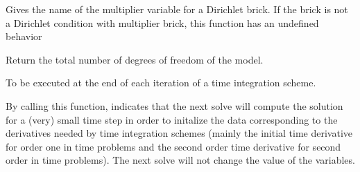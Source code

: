 \documentclass[a4paper,11pt,english]{sphinxmanual}
\begin{document}
\begin{fulllineitems}
\begin{fulllineitems}
\label{\detokenize{python/cmdref_Model:getfem.Model.mult_varname_Dirichlet}}
Gives the name of the multiplier variable for a Dirichlet brick.
If the brick is not a Dirichlet condition with multiplier brick,
this function has an undefined behavior

\end{fulllineitems}


\begin{fulllineitems}
\label{\detokenize{python/cmdref_Model:getfem.Model.nbdof}}
Return the total number of degrees of freedom of the model.

\end{fulllineitems}


\begin{fulllineitems}
\label{\detokenize{python/cmdref_Model:getfem.Model.next_iter}}
To be executed at the end of each iteration of a time
integration scheme.

\end{fulllineitems}


\begin{fulllineitems}
\label{\detokenize{python/cmdref_Model:getfem.Model.perform_init_time_derivative}}
By calling this function, indicates that the next solve will compute
the solution for a (very) small time step  in order to initalize
the data corresponding to the derivatives needed by time integration
schemes (mainly the initial time derivative for order one in time
problems  and the second order time derivative for second order in time
problems). The next solve will not change the value of the variables.

\end{fulllineitems}


\end{fulllineitems}
\end{document}
